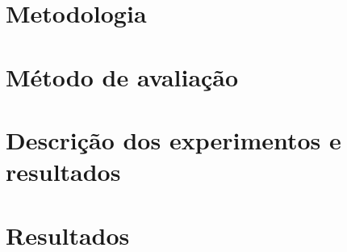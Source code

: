 \section{Metodologia}
\label{cha:metodologia}
	

\newpage

\section{Método de avaliação}
\label{cha:avaliacao}
	

\newpage

\section{Descrição dos experimentos e resultados}
\label{cha:experimentos}
	

\newpage

\section{Resultados}
\label{cha:resultados}
	

